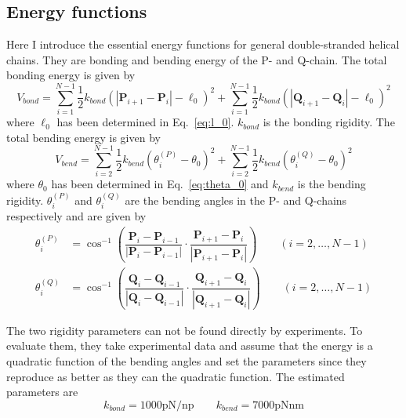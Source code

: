 \documentclass[a4paper,10pt]{article}
\begin{document}
\subsection{Energy functions}
Here I introduce the essential energy functions for general double-stranded helical chains.
They are bonding and bending energy of the P- and Q-chain.
The total bonding energy is given by
\begin{equation}\label{eq:bond}
V_{bond}=\sum_{i=1}^{N-1}\dfrac{1}{2}k_{bond}\left(\left|\textbf{P}_{i+1}-\textbf{P}_{i}\right|-\ell_0\right)^2+\sum_{i=1}^{N-1}\dfrac{1}{2}k_{bond}\left(\left|\textbf{Q}_{i+1}-\textbf{Q}_{i}\right|-\ell_0\right)^2
\end{equation}
where $\ell_0$ has been determined in Eq.~\ref{eq:l_0}.
$k_{bond}$ is the bonding rigidity.
The total bending energy is given by
\begin{equation}\label{eq:bend}
V_{bend}=\sum_{i=2}^{N-1}\dfrac{1}{2}k_{bend}\left(\theta_i^{(P)}-\theta_0\right)^2+\sum_{i=2}^{N-1}\dfrac{1}{2}k_{bend}\left(\theta_i^{(Q)}-\theta_0\right)^2
\end{equation}
where $\theta_0$ has been determined in Eq.~\ref{eq:theta_0} and $k_{bend}$ is the bending rigidity.
$\theta_i^{(P)}$ and $\theta_i^{(Q)}$ are the bending angles in the P- and Q-chains respectively and are given by~\cite{old}
\begin{equation}
\begin{split}
\theta_i^{(P)} & =\cos^{-1}\left(\dfrac{\textbf{P}_{i}-\textbf{P}_{i-1}}{\left|\textbf{P}_{i}-\textbf{P}_{i-1}\right|}\cdot\dfrac{\textbf{P}_{i+1}-\textbf{P}_{i}}{\left|\textbf{P}_{i+1}-\textbf{P}_{i}\right|}\right)\qquad \left(i=2,\dots,N-1\right) \\
\theta_i^{(Q)} & =\cos^{-1}\left(\dfrac{\textbf{Q}_{i}-\textbf{Q}_{i-1}}{\left|\textbf{Q}_{i}-\textbf{Q}_{i-1}\right|}\cdot\dfrac{\textbf{Q}_{i+1}-\textbf{Q}_{i}}{\left|\textbf{Q}_{i+1}-\textbf{Q}_{i}\right|}\right)\qquad \left(i=2,\dots,N-1\right)
\end{split}
\end{equation}

The two rigidity parameters can not be found directly by experiments.
To evaluate them, they take experimental data and assume that the energy is a quadratic function of the bending angles and set the parameters since they reproduce as better as they can the quadratic function.
The estimated parameters are
\begin{equation}
k_{bond}=1000\text{pN/np}\qquad k_{bend}=7000\text{pNnm}
\end{equation}
\end{document}
